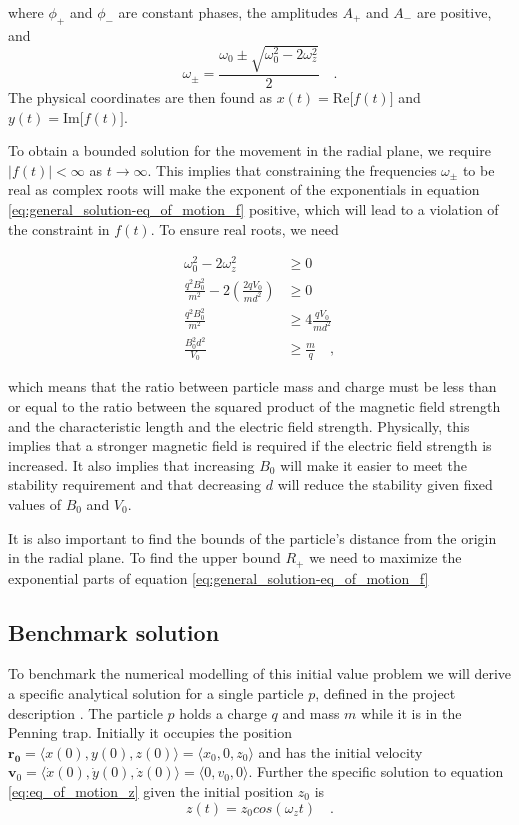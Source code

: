 \documentclass[../main_proj3.tex]{subfiles}
\begin{document}
where $\phi_+$ and $\phi_-$ are constant phases, the amplitudes $A_+$ and $A_-$ are positive, and 
$$
\omega_\pm = \frac{\omega_0 \pm \sqrt{\omega_0^2 - 2\omega_z^2}}{2} \quad.
$$
The physical coordinates are then found as $x(t) = \text{Re}\big[f(t)\big]$ and $y(t) = \text{Im} \big[f(t)\big]$.

To obtain a bounded solution for the movement in the radial plane, we require $|f(t)| < \infty$ as $t\to \infty$. This implies that constraining the frequencies $\omega_\pm$ to be real as complex roots will make the exponent of the exponentials in equation \eqref{eq:general_solution-eq_of_motion_f} positive, which will lead to a violation of the constraint in $f(t)$. To ensure real roots, we need 

\begin{equation}
\label{eq:frequency_constraint}
\begin{split}
    \omega_0^{2} - 2\omega_z^{2} &\geq 0 \\ 
    \frac{q^{2}B_0^{2}}{m^{2}} - 2\left(\frac{2qV_0}{md^{2}}\right) & \geq 0 \\
    \frac{q^{2}B_0^{2}}{m^{2}} & \geq 4 \frac{qV_0}{md^{2}} \\
    \frac{B_0^{2}d^{2}}{V_0} &\geq \frac{m}{q} \quad ,
\end{split}
\end{equation}

which means that the ratio between particle mass and charge must be less than or equal to the ratio between the squared product of the magnetic field strength and the characteristic length and the electric field strength. Physically, this implies that a stronger magnetic field is required if the electric field strength is increased. It also implies that increasing $B_0$ will make it easier to meet the stability requirement and that decreasing $d$ will reduce the stability given fixed values of $B_0$ and $V_0$.  

It is also important to find the bounds of the particle's distance from the origin in the radial plane. To find the upper bound $R_+$ we need to maximize the exponential parts of equation \eqref{eq:general_solution-eq_of_motion_f} 

\subsection{Benchmark solution}

To benchmark the numerical modelling of this initial value problem we will derive a specific analytical solution for a single particle $p$, defined in the project description \cite{prosjekttbeskrivelse3}. The particle $p$ holds a charge $q$ and mass $m$ while it is in the Penning trap. Initially it occupies the position 
$\mathbf{r_0} = \bigl\langle x(0), y(0), z(0) \bigr\rangle = \bigl\langle x_0, 0, z_0 \rangle$ and has the initial velocity $\mathbf{v}_0 = \bigl\langle 
\dot{x}(0), \dot{y}(0), \dot{z}(0)
\bigr\rangle = \bigl\langle 
0, v_0, 0 \bigr\rangle$. Further the specific solution to equation \eqref{eq:eq_of_motion_z} given the initial position $z_0$ is 
\begin{equation}
\label{eq:specific_solution-eq_of_motion_z}
z(t) = z_0 cos(\omega_z t) \quad.
\end{equation}
\end{document}
